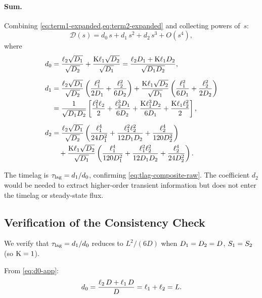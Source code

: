 \paragraph{Sum.}  Combining \cref{eq:term1-expanded,eq:term2-expanded} and
collecting powers of~$s$:
\begin{equation}
  \mathcal{D}(s) = d_0\,s + d_1\,s^2 + d_2\,s^3 + O(s^4),
\end{equation}
where
\begin{align}
  d_0 &= \frac{\ell_{2}\sqrt{D_{1}}}{\sqrt{D_{2}}}
    + \frac{\mathrm{K}\ell_{1}\sqrt{D_{2}}}{\sqrt{D_{1}}}
    = \frac{\ell_{2}D_{1} + \mathrm{K}\ell_{1}D_{2}}{\sqrt{D_{1}D_{2}}},
  \label{eq:d0-app}\\[6pt]
  d_1 &= \frac{\ell_{2}\sqrt{D_{1}}}{\sqrt{D_{2}}}
    \left(\frac{\ell_{1}^2}{2D_{1}} + \frac{\ell_{2}^2}{6D_{2}}\right)
    + \frac{\mathrm{K}\ell_{1}\sqrt{D_{2}}}{\sqrt{D_{1}}}
    \left(\frac{\ell_{1}^2}{6D_{1}} + \frac{\ell_{2}^2}{2D_{2}}\right)
  \notag\\
  &= \frac{1}{\sqrt{D_{1}D_{2}}}
    \left[\frac{\ell_{1}^2\ell_{2}}{2}
    + \frac{\ell_{2}^3D_{1}}{6D_{2}}
    + \frac{\mathrm{K}\ell_{1}^3D_{2}}{6D_{1}}
    + \frac{\mathrm{K}\ell_{1}\ell_{2}^2}{2}\right],
  \label{eq:d1-app}\\[6pt]
  d_2 &= \frac{\ell_{2}\sqrt{D_{1}}}{\sqrt{D_{2}}}
    \left(\frac{\ell_{1}^4}{24D_{1}^2}
    + \frac{\ell_{1}^2\ell_{2}^2}{12D_{1}D_{2}}
    + \frac{\ell_{2}^4}{120D_{2}^2}\right)
  \notag\\
  &\quad+ \frac{\mathrm{K}\ell_{1}\sqrt{D_{2}}}{\sqrt{D_{1}}}
    \left(\frac{\ell_{1}^4}{120D_{1}^2}
    + \frac{\ell_{1}^2\ell_{2}^2}{12D_{1}D_{2}}
    + \frac{\ell_{2}^4}{24D_{2}^2}\right).
  \label{eq:d2-app}
\end{align}

The timelag is $\tau_{\mathrm{lag}} = d_1/d_0$, confirming \cref{eq:tlag-composite-raw}.
The coefficient $d_2$ would be needed to extract higher-order transient
information but does not enter the timelag or steady-state flux.

\subsection{Verification of the Consistency Check}
\label{sec:app-consistency}

We verify that $\tau_{\mathrm{lag}} = d_1/d_0$ reduces to $L^2/(6D)$ when
$D_{1} = D_{2} = D$, $S_{1} = S_{2}$ (so $\mathrm{K} = 1$).

From \cref{eq:d0-app}:
\begin{equation}
  d_0 = \frac{\ell_{2}\,D + \ell_{1}\,D}{D}
  = \ell_{1} + \ell_{2} = L.
\end{equation}

